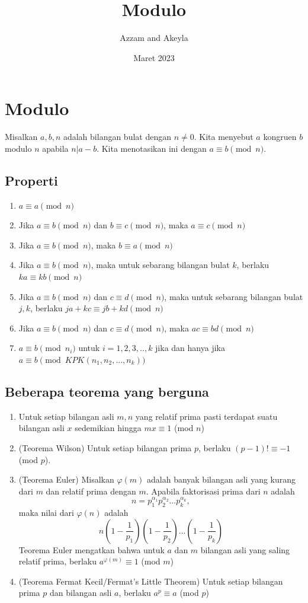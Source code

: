\documentclass[11pt]{scrartcl}
\title{Modulo}
\author{Azzam and Akeyla}
\date{Maret 2023}
\begin{document}
\maketitle

\renewcommand*\contentsname{Daftar Isi}
\tableofcontents

\newpage

\section{Modulo}
Misalkan $a,b,n$ adalah bilangan bulat dengan $n \neq 0$. Kita menyebut $a$ kongruen $b$ modulo $n$ apabila $n|a - b$. Kita menotasikan ini dengan $a \equiv b \pmod{n}$. 
\subsection{Properti}
\begin{enumerate}
\item $a \equiv a \pmod{n}$
\item Jika $a \equiv b \pmod{n}$ dan $b \equiv c \pmod{n}$, maka $a \equiv c \pmod{n}$
\item Jika $a \equiv b \pmod{n}$, maka $b \equiv a \pmod{n}$ 
\item Jika $a \equiv b \pmod{n}$, maka untuk sebarang bilangan bulat $k$, berlaku $ka \equiv kb \pmod{n}$
\item Jika $a \equiv b \pmod{n}$ dan $c \equiv d \pmod{n}$, maka untuk sebarang bilangan bulat $j,k$, berlaku $ja + kc \equiv jb + kd \pmod{n}$
\item Jika $a \equiv b \pmod{n}$ dan $c \equiv d \pmod{n}$, maka $ac \equiv bd \pmod{n}$
\item $a \equiv b \pmod{n_i}$ untuk $i = 1,2,3,..,k$ jika dan hanya jika $a \equiv b \pmod{ KPK(n_1,n_2,...,n_k)} $
\end{enumerate}

\subsection{Beberapa teorema yang berguna}
\begin{enumerate}
\item Untuk setiap bilangan asli $m,n$ yang relatif prima pasti terdapat suatu bilangan asli $x$ sedemikian hingga $mx \equiv 1$ (mod $n$) 
\item (Teorema Wilson) Untuk setiap bilangan prima $p$, berlaku $(p -1)! \equiv -1$ (mod $p$).
\item (Teorema Euler) Misalkan $\varphi (m)$ adalah banyak bilangan asli yang kurang dari $m$ dan relatif prima dengan $m$. Apabila faktorisasi prima dari $n$ adalah \[n = p_1^{\alpha_1}p_2^{\alpha_2}...p_k^{\alpha_k},\] maka nilai dari $\varphi(n)$ adalah \[n\left(1 - \dfrac{1}{p_1}\right)\left(1 - \dfrac{1}{p_2}\right)...\left(1 - \dfrac{1}{p_k}\right)\] Teorema Euler mengatkan bahwa untuk $a$ dan $m$ bilangan asli yang saling relatif prima, berlaku $a^{\varphi (m)} \equiv 1$ (mod $m$)
\item (Teorema Fermat Kecil/Fermat's Little Theorem) Untuk setiap bilangan prima $p$ dan bilangan asli $a$, berlaku $a^p \equiv a$ (mod $p$)
\end{enumerate}
\end{document}
